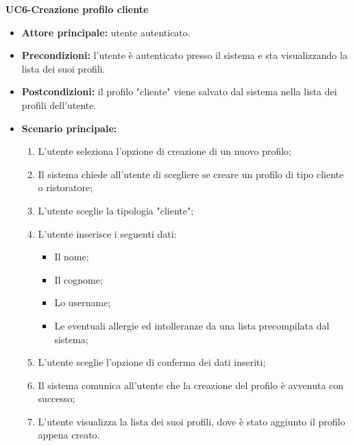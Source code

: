 \textbf{UC6-Creazione profilo cliente}
\begin{itemize}
    \item \textbf{Attore principale:} utente autenticato.
    \item \textbf{Precondizioni:} l'utente è autenticato presso il sistema e sta visualizzando
    la lista dei suoi profili.
    \item \textbf{Postcondizioni:} il profilo "cliente" viene salvato dal sistema nella lista dei profili
    dell'utente.
    \item \textbf{Scenario principale:}
    \begin{enumerate}
        \item L'utente seleziona l'opzione di creazione di un nuovo profilo;
        \item Il sistema chiede all'utente di scegliere se creare un profilo di tipo cliente
        o ristoratore;
        \item L'utente sceglie la tipologia "cliente";
        \item L'utente inserisce i seguenti dati:
        \begin{itemize}
            \item Il nome;
            \item Il cognome;
            \item Lo username;
            \item Le eventuali allergie ed intolleranze da una lista precompilata dal sistema;
        \end{itemize}
        \item L'utente sceglie l'opzione di conferma dei dati inseriti;
        \item Il sistema comunica all'utente che la creazione del profilo è avvenuta con successo;
        \item L'utente visualizza la lista dei suoi profili, dove è stato aggiunto il profilo appena creato.
    \end{enumerate}
\end{itemize}

